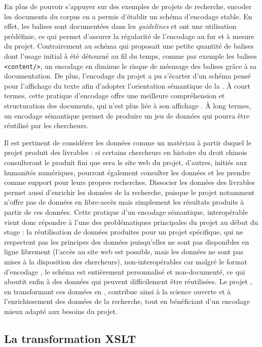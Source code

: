 En plus de pouvoir s'appuyer sur des exemples de projets de recherche, encoder les documents du corpus en \TEI a permis d'établir un schéma d'encodage stable. En effet, les balises \TEI sont documentées dans les \textit{guidelines} et ont une utilisation prédéfinie, ce qui permet d'assurer la régularité de l'encodage au fur et à mesure du projet. Contrairement au schéma \LSC qui proposait une petite quantité de balises dont l'usage initial à été détourné au fil du temps, comme par exemple les balises \texttt{<content/>}, un encodage en \TEI diminue le risque de mésusage des balises grâce à sa documentation. De plus, l'encodage du projet a pu s'écarter d'un schéma pensé pour l'affichage du texte afin d'adopter l'orientation sémantique de la \TEI. À court termes, cette pratique d'encodage offre une meilleure compréhension et structuration des documents, qui n'est plus liée à son affichage \HTML. À long termes, un encodage sémantique permet de produire un jeu de données qui pourra être réutilisé par les chercheurs. 

Il est pertinent de considérer les données comme un matériau à partir duquel le projet produit des livrables : si certains chercheurs en histoire du droit chinois consulteront le produit fini que sera le site web du projet, d'autres, initiés aux humanités numériques, pourront également consulter les données \TEI et les prendre comme support pour leurs propres recherches. Dissocier les données des livrables permet aussi d'enrichir les données de la recherche, puisque le projet \LSC notamment n'offre pas de données en libre-accès mais simplement les résultats produits à partir de ces données. Cette pratique d'un encodage sémantique, interopérable vient donc répondre à l'une des problématiques principales du projet au début du stage : la réutilisation de données produites pour un projet spécifique, qui ne respectent pas les principes \fair des données puisqu'elles ne sont pas disponibles en ligne librement (l'accès au site web \LSC est possible, mais les données ne sont pas mises à la disposition des chercheurs), non-interopérables car malgré le format d'encodage \XML, le schéma est entièrement personnalisé et non-documenté, ce qui aboutit enfin à des données qui peuvent difficilement être réutilisées. Le projet \COREL, en transformant ces données en \TEI, contribue ainsi à la science ouverte et à l'enrichissement des données de la recherche, tout en bénéficiant d'un encodage mieux adapté aux besoins du projet. 

\subsection{La transformation XSLT}

